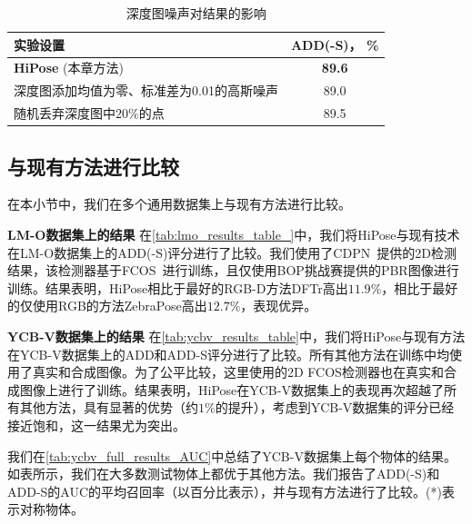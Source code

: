 \begin{table}[h]
    \centering
        \begin{tabular}{@{}l|c@{}}
          \toprule
          实验设置 & ADD(-S)， \% \\
          \midrule
          \textbf{HiPose} (本章方法) &  \textbf{89.6}\\
          \midrule
          深度图添加均值为零、标准差为0.01的高斯噪声 & 89.0\\
          随机丢弃深度图中$20\%$的点 & 89.5 \\
          \bottomrule
        \end{tabular}
    \caption{深度图噪声对结果的影响}
    \label{tab:influence_of_noisy_depth}
\end{table}

\subsection{与现有方法进行比较}
在本小节中，我们在多个通用数据集上与现有方法进行比较。



\textbf{LM-O数据集上的结果 } 在\autoref{tab:lmo_results_table_}中，我们将HiPose与现有技术在LM-O数据集上的ADD(-S)评分进行了比较。我们使用了CDPN~\cite{li2019cdpn}提供的2D检测结果，该检测器基于FCOS~\cite{Tian2019FCOSFC}进行训练，且仅使用BOP挑战赛提供的PBR图像进行训练。结果表明，HiPose相比于最好的RGB-D方法DFTr高出$11.9\%$，相比于最好的仅使用RGB的方法ZebraPose高出$12.7\%$，表现优异。



\textbf{YCB-V数据集上的结果 } 在\autoref{tab:ycbv_results_table}中，我们将HiPose与现有方法在YCB-V数据集上的ADD和ADD-S评分进行了比较。所有其他方法在训练中均使用了真实和合成图像。为了公平比较，这里使用的2D FCOS检测器也在真实和合成图像上进行了训练。结果表明，HiPose在YCB-V数据集上的表现再次超越了所有其他方法，具有显著的优势（约$1\%$的提升），考虑到YCB-V数据集的评分已经接近饱和，这一结果尤为突出。

我们在\autoref{tab:ycbv_full_results_AUC}中总结了YCB-V数据集上每个物体的结果。如表所示，我们在大多数测试物体上都优于其他方法。我们报告了ADD(-S)和ADD-S的AUC的平均召回率（以百分比表示），并与现有方法进行了比较。(*)表示对称物体。



